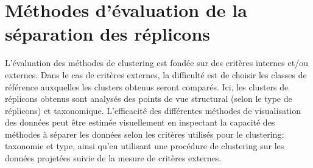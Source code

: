     
\section{Méthodes d'évaluation de la séparation des réplicons}
    
    L'évaluation des méthodes de clustering est fondée sur des critères internes et/ou externes. Dans le cas de critères externes, la difficulté est de choisir les classes de référence auxquelles les clusters obtenus seront comparés. Ici, les clusters de réplicons obtenus sont analysés des points de vue structural (selon le type de réplicons) et taxonomique. L'efficacité des différentes méthodes de visualisation des données peut être estimée visuellement en inspectant la capacité des méthodes à séparer les données selon les critères utilisés pour le clustering: taxonomie et type, ainsi qu'en utilisant une procédure de clustering sur les données projetées suivie de la mesure de critères externes.
   
